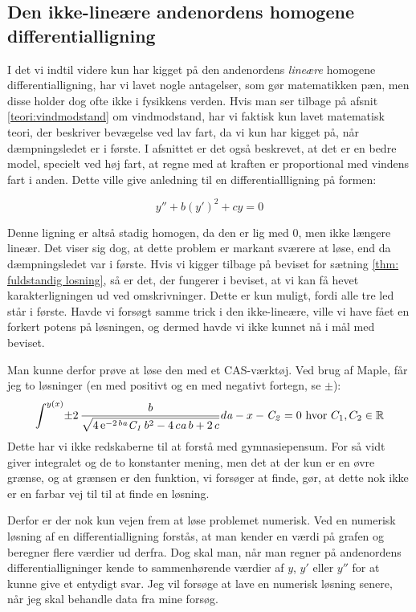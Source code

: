 \subsection{Den ikke-lineære andenordens homogene differentialligning}
\label{teori: Den ikke-linear andenordens ligning}
I det vi indtil videre kun har kigget på den andenordens \textit{lineære} homogene differentialligning, har vi lavet nogle antagelser, som gør matematikken pæn, men disse holder dog ofte ikke i fysikkens verden.
Hvis man ser tilbage på afsnit \ref{teori:vindmodstand} om vindmodstand, har vi faktisk kun lavet matematisk teori, der beskriver bevægelse ved lav fart, da vi kun har kigget på, når dæmpningsledet er i første. 
I afsnittet er det også beskrevet, at det er en bedre model, specielt ved høj fart, at regne med at kraften er proportional med vindens fart i anden.
Dette ville give anledning til en differentiallligning på formen:

$$y'' + b(y')^2 + cy = 0$$

Denne ligning er altså stadig homogen, da den er lig med $0$, men ikke længere lineær. 
Det viser sig dog, at dette problem er markant sværere at løse, end da dæmpningsledet var i første. 
Hvis vi kigger tilbage på beviset for sætning \ref{thm: fuldstandig losning}, så er det, der fungerer i beviset, at vi kan få hevet karakterligningen ud ved omskrivninger. 
Dette er kun muligt, fordi alle tre led står i første. 
Havde vi forsøgt samme trick i den ikke-lineære, ville vi have fået en forkert potens på løsningen, og dermed havde vi ikke kunnet nå i mål med beviset. 

Man kunne derfor prøve at løse den med et CAS-værktøj. 
Ved brug af Maple, får jeg to løsninger (en med positivt og en med negativt fortegn, se $\pm$):
$$\int ^{y \left( x \right) }\!\pm 2\,{\frac {b}{\sqrt {4\,{{\rm e}^{-2\,b{
\it a}}}{\it C_1}\,{b}^{2}-4\,c{\it a}\,b+2\,c}}}{d{\it a}}-x-{
\it C_2}=0 \text{ hvor } C_1,C_2 \in \mathbb{R}
$$
Dette har vi ikke redskaberne til at forstå med gymnasiepensum. 
For så vidt giver integralet og de to konstanter mening, men det at der kun er en øvre grænse, og at grænsen er den funktion, vi forsøger at finde, gør, at dette nok ikke er en farbar vej til til at finde en løsning. 

Derfor er der nok kun vejen frem at løse problemet numerisk. 
Ved en numerisk løsning af en differentialligning forstås, at man kender en værdi på grafen og beregner flere værdier ud derfra.
Dog skal man, når man regner på andenordens differentialligninger kende to sammenhørende værdier af $y$, $y'$ eller $y''$ for at kunne give et entydigt svar.
Jeg vil forsøge at lave en numerisk løsning senere, når jeg skal behandle data fra mine forsøg. 
